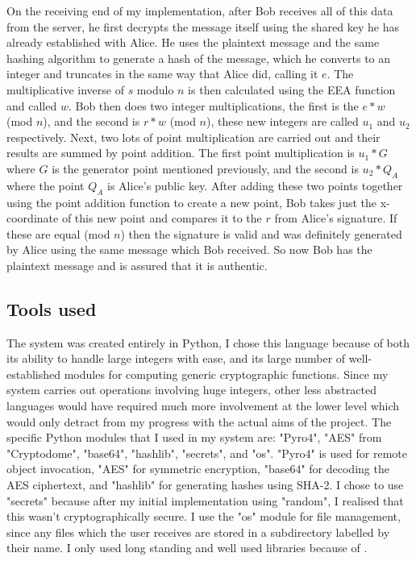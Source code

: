 \documentclass[12pt,a4paper]{article}
\begin{document}
On the receiving end of my implementation, after Bob receives all of this data from the server, 
he first decrypts the message itself using the shared key he has already established with Alice. 
He uses the plaintext message and the same hashing algorithm to generate a hash of the message, 
which he converts to an integer and truncates in the same way that Alice did, calling it $e$. 
The multiplicative inverse of $s$ modulo $n$ is then calculated using the EEA function and called $w$. 
Bob then does two integer multiplications, the first is the $e*w$ (mod $n$), 
and the second is $r*w$ (mod $n$), these new integers are called $u_1$ and $u_2$ respectively. 
Next, two lots of point multiplication are carried out and their results are summed by point addition. 
The first point multiplication is $u_1*G$ where $G$ is the generator point mentioned previously, 
and the second is $u_2*Q_A$ where the point $Q_A$ is Alice's public key. 
After adding these two points together using the point addition function to create a new point, 
Bob takes just the x-coordinate of this new point and compares it to the $r$ from Alice's signature. 
If these are equal (mod $n$) then the signature is valid and was definitely generated by Alice using the same message which Bob received. 
So now Bob has the plaintext message and is assured that it is authentic. 


\subsection{Tools used} \label{Tools}
The system was created entirely in Python, I chose this language because of both its ability to handle large integers with ease, 
and its large number of well-established modules for computing generic cryptographic functions. 
Since my system carries out operations involving huge integers, other less abstracted languages would 
have required much more involvement at the lower level which would only detract from my progress with the actual aims of the project. 
The specific Python modules that I used in my system are: "Pyro4", "AES" from "Cryptodome", "base64", "hashlib", "secrets", and "os". 
"Pyro4" is used for remote object invocation, "AES" for symmetric encryption, "base64" for decoding the AES ciphertext, 
and "hashlib" for generating hashes using SHA-2. 
I chose to use "secrets" because after my initial implementation using "random", I realised that this wasn't cryptographically secure. 
I use the "os" module for file management, since any files which the user receives are stored in a subdirectory labelled by their name. 
I only used long standing and well used libraries because of \cite{ducklin2021python}. 
\end{document}
